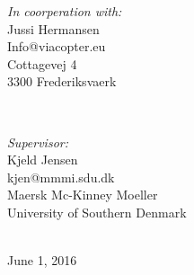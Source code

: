 \begin{titlepage}
\begin{minipage}{0.4\textwidth}
\begin{flushleft} \large
\emph{In coorperation with:}\\
Jussi Hermansen \\
Info@viacopter.eu \\
Cottagevej 4  \\
3300 Frederiksvaerk \\
\end{flushleft}
\end{minipage}
~
\begin{minipage}{0.4\textwidth}
\begin{flushright} \large
\emph{Supervisor:} \\
Kjeld Jensen \\ %
kjen@mmmi.sdu.dk \\
Maersk Mc-Kinney Moeller \\
University of Southern Denmark
\end{flushright}
\end{minipage}\\[4cm]




{\large June 1, 2016}\\[3cm] %


 

\vfill %

\end{titlepage}
